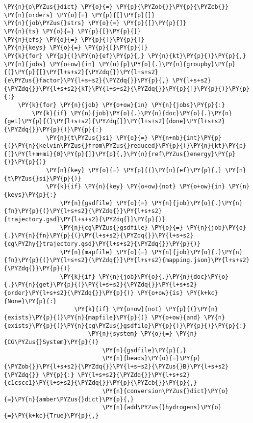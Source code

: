 \begin{tcolorbox}[breakable, size=fbox, boxrule=1pt, pad at break*=1mm,colback=cellbackground, colframe=cellborder]
\begin{Verbatim}[commandchars=\\\{\}]
\PY{n}{o\PYZus{}dict} \PY{o}{=} \PY{p}{\PYZob{}}\PY{p}{\PYZcb{}}
\PY{n}{orders} \PY{o}{=} \PY{p}{[}\PY{p}{]}
\PY{n}{job\PYZus{}strs} \PY{o}{=} \PY{p}{[}\PY{p}{]}
\PY{n}{ts} \PY{o}{=} \PY{p}{[}\PY{p}{]}
\PY{n}{efs} \PY{o}{=} \PY{p}{[}\PY{p}{]}
\PY{n}{keys} \PY{o}{=} \PY{p}{[}\PY{p}{]}
\PY{k}{for} \PY{p}{(}\PY{n}{ef}\PY{p}{,} \PY{n}{kt}\PY{p}{)}\PY{p}{,} \PY{n}{jobs} \PY{o+ow}{in} \PY{n}{p}\PY{o}{.}\PY{n}{groupby}\PY{p}{(}\PY{p}{[}\PY{l+s+s2}{\PYZdq{}}\PY{l+s+s2}{e\PYZus{}factor}\PY{l+s+s2}{\PYZdq{}}\PY{p}{,} \PY{l+s+s2}{\PYZdq{}}\PY{l+s+s2}{kT}\PY{l+s+s2}{\PYZdq{}}\PY{p}{]}\PY{p}{)}\PY{p}{:}
    \PY{k}{for} \PY{n}{job} \PY{o+ow}{in} \PY{n}{jobs}\PY{p}{:}
        \PY{k}{if} \PY{n}{job}\PY{o}{.}\PY{n}{doc}\PY{o}{.}\PY{n}{get}\PY{p}{(}\PY{l+s+s2}{\PYZdq{}}\PY{l+s+s2}{done}\PY{l+s+s2}{\PYZdq{}}\PY{p}{)}\PY{p}{:}
            \PY{n}{t\PYZus{}si} \PY{o}{=} \PY{n+nb}{int}\PY{p}{(}\PY{n}{kelvin\PYZus{}from\PYZus{}reduced}\PY{p}{(}\PY{n}{kt}\PY{p}{[}\PY{l+m+mi}{0}\PY{p}{]}\PY{p}{,}\PY{n}{ref\PYZus{}energy}\PY{p}{)}\PY{p}{)}
            \PY{n}{key} \PY{o}{=} \PY{p}{(}\PY{n}{ef}\PY{p}{,} \PY{n}{t\PYZus{}si}\PY{p}{)}
            \PY{k}{if} \PY{n}{key} \PY{o+ow}{not} \PY{o+ow}{in} \PY{n}{keys}\PY{p}{:}
                \PY{n}{gsdfile} \PY{o}{=} \PY{n}{job}\PY{o}{.}\PY{n}{fn}\PY{p}{(}\PY{l+s+s2}{\PYZdq{}}\PY{l+s+s2}{trajectory.gsd}\PY{l+s+s2}{\PYZdq{}}\PY{p}{)}
                \PY{n}{cg\PYZus{}gsdfile} \PY{o}{=} \PY{n}{job}\PY{o}{.}\PY{n}{fn}\PY{p}{(}\PY{l+s+s2}{\PYZdq{}}\PY{l+s+s2}{cg\PYZhy{}trajectory.gsd}\PY{l+s+s2}{\PYZdq{}}\PY{p}{)}
                \PY{n}{mapfile} \PY{o}{=} \PY{n}{job}\PY{o}{.}\PY{n}{fn}\PY{p}{(}\PY{l+s+s2}{\PYZdq{}}\PY{l+s+s2}{mapping.json}\PY{l+s+s2}{\PYZdq{}}\PY{p}{)}
                \PY{k}{if} \PY{n}{job}\PY{o}{.}\PY{n}{doc}\PY{o}{.}\PY{n}{get}\PY{p}{(}\PY{l+s+s2}{\PYZdq{}}\PY{l+s+s2}{order}\PY{l+s+s2}{\PYZdq{}}\PY{p}{)} \PY{o+ow}{is} \PY{k+kc}{None}\PY{p}{:}
                    \PY{k}{if} \PY{o+ow}{not} \PY{p}{(}\PY{n}{exists}\PY{p}{(}\PY{n}{mapfile}\PY{p}{)} \PY{o+ow}{and} \PY{n}{exists}\PY{p}{(}\PY{n}{cg\PYZus{}gsdfile}\PY{p}{)}\PY{p}{)}\PY{p}{:}
                        \PY{n}{system} \PY{o}{=} \PY{n}{CG\PYZus{}System}\PY{p}{(}
                            \PY{n}{gsdfile}\PY{p}{,} 
                            \PY{n}{beads}\PY{o}{=}\PY{p}{\PYZob{}}\PY{l+s+s2}{\PYZdq{}}\PY{l+s+s2}{\PYZus{}B}\PY{l+s+s2}{\PYZdq{}} \PY{p}{:} \PY{l+s+s2}{\PYZdq{}}\PY{l+s+s2}{c1cscc1}\PY{l+s+s2}{\PYZdq{}}\PY{p}{\PYZcb{}}\PY{p}{,} 
                            \PY{n}{conversion\PYZus{}dict}\PY{o}{=}\PY{n}{amber\PYZus{}dict}\PY{p}{,}
                            \PY{n}{add\PYZus{}hydrogens}\PY{o}{=}\PY{k+kc}{True}\PY{p}{,}

\end{Verbatim}
\end{tcolorbox}
